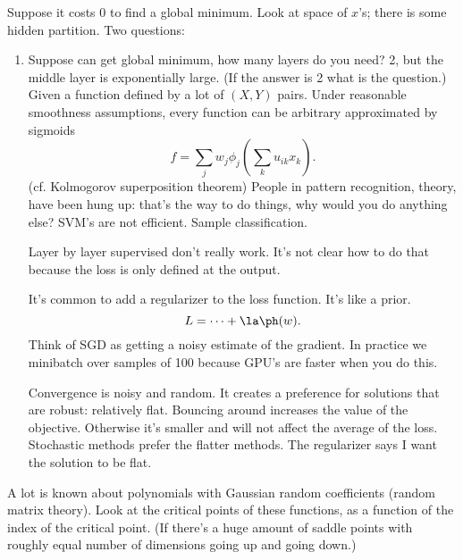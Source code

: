 Suppose it costs 0 to find a global minimum. Look at space of $x$'s; there is some hidden partition.
Two questions: 
\begin{enumerate}
\item
Suppose can get global minimum, how many layers do you need? 2, but the middle layer is exponentially large. (If the answer is 2 what is the question.) Given a function defined by a lot of $(X,Y)$ pairs.
Under reasonable smoothness assumptions, every function can be arbitrary approximated by sigmoids
\[
f=\sum_j w_j \phi_j(\sum_k u_{ik} x_k).
\] (cf. Kolmogorov superposition theorem) People in pattern recognition, theory, have been hung up: that's the way to do things, why would you do anything else? SVM's are not efficient.
Sample classification.


Layer by layer supervised don't really work. It's not clear how to do that because the loss is only defined at the output.

It's common to add a regularizer to the loss function. It's like a prior. %
\[
L=\cdots + \la \ph(w).
\]
Think of SGD as getting a noisy estimate of the gradient. In practice we minibatch over samples of 100 because GPU's are faster when you do this.

Convergence is noisy and random. It creates a preference for solutions that are robust: relatively flat. %
Bouncing around increases the value of the objective. Otherwise it's smaller and will not affect the average of the loss. Stochastic methods prefer the flatter methods. The regularizer says I want the solution to be flat.
\end{enumerate}

A lot is known about polynomials with Gaussian random coefficients (random matrix theory). Look at the critical points of these functions, as a function of the index of the critical point. (If there's a huge amount of saddle points with roughly equal number of dimensions going up and going down.)

